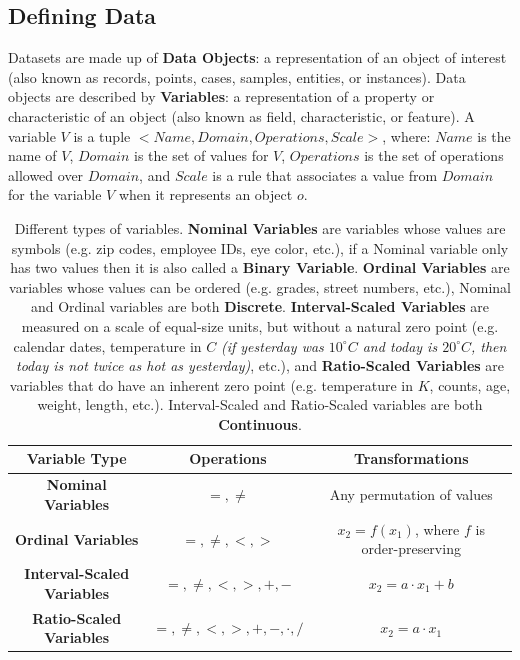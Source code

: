\documentclass[12pt]{article}
\begin{document}
\subsection{Defining Data}
Datasets are made up of \textbf{Data Objects}: a representation of an object of interest (also known as records, points, cases, samples, entities, or instances).
Data objects are described by \textbf{Variables}: a representation of a property or characteristic of an object (also known as field, characteristic, or feature).
A variable $V$ is a tuple $<Name, Domain, Operations, Scale>$, where: $Name$ is the name of $V$, $Domain$ is the set of values for $V$, $Operations$ is the set of operations allowed over $Domain$, and $Scale$ is a rule that associates a value from $Domain$ for the variable $V$ when it represents an object $o$.

\begin{table}[h]
    \centering
    \begin{tabular}{ccc}
    Variable Type & Operations & Transformations \\ \hline
    \textbf{Nominal Variables} & $=, \neq$ & Any permutation of values \\
    \textbf{Ordinal Variables} & $=, \neq, <, >$ & $x_2 = f(x_1)$, where $f$ is order-preserving \\
    \textbf{Interval-Scaled Variables} & $=, \neq, <, >, +, -$ & $x_2 = a \cdot x_1 + b$ \\
    \textbf{Ratio-Scaled Variables} & $=, \neq, <, >, +, -, \cdot, /$ & $x_2 = a \cdot x_1$
    \end{tabular}
    \caption{Different types of variables. \textbf{Nominal Variables} are variables whose values are symbols (e.g. zip codes, employee IDs, eye color, etc.), if a Nominal variable only has two values then it is also called a \textbf{Binary Variable}. \textbf{Ordinal Variables} are variables whose values can be ordered (e.g. grades, street numbers, etc.), Nominal and Ordinal variables are both \textbf{Discrete}. \textbf{Interval-Scaled Variables} are measured on a scale of equal-size units, but without a natural zero point (e.g. calendar dates, temperature in $C$ \textit{(if yesterday was $10^\circ C$ and today is $20^\circ C$, then today is not twice as hot as yesterday)}, etc.), and \textbf{Ratio-Scaled Variables} are variables that do have an inherent zero point (e.g. temperature in $K$, counts, age, weight, length, etc.). Interval-Scaled and Ratio-Scaled variables are both \textbf{Continuous}.}
\end{table}
\end{document}
